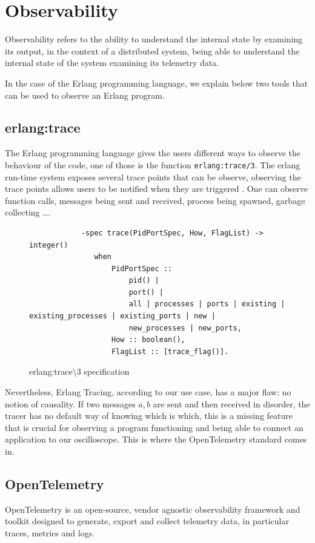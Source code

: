 \section{Observability}
        Observability refers to the ability to understand the internal state by examining its output, in the context of a distributed system, being able to understand the internal state of the system examining its telemetry data. \cite{otel-o}

    In the case of the Erlang programming language, we explain below two tools that can be used to observe an Erlang program.
    
    \subsection{erlang:trace}
        The Erlang programming language gives the users different ways to observe the behaviour of the code, one of those is the function \texttt{erlang:trace/3}. The erlang run-time system exposes several trace points that can be observe, observing the trace points allows users to be notified when they are triggered \cite{erl-t}. One can observe function calls, messages being sent and received, process being spawned, garbage collecting \dots. 
        \begin{figure}[!ht]
        \centering
        \begin{verbatim}
            -spec trace(PidPortSpec, How, FlagList) -> integer()
               when
                   PidPortSpec ::
                       pid() |
                       port() |
                       all | processes | ports | existing | existing_processes | existing_ports | new |
                       new_processes | new_ports,
                   How :: boolean(),
                   FlagList :: [trace_flag()].
        \end{verbatim}
        \caption{erlang:trace\textbackslash3 specification}
\end{figure}

    Nevertheless, Erlang Tracing, according to our use case, has a major flaw: no notion of causality. If two messages $a, b$ are sent and then received in disorder, the tracer has no default way of knowing which is which, this is a missing feature that is crucial for observing a program functioning and being able to connect an application to our oscilloscope.  This is where the OpenTelemetry standard comes in.

\subsection{OpenTelemetry}
    OpenTelemetry is an open-source, vendor agnostic observability framework and toolkit designed to generate, export and collect telemetry data, in particular traces, metrics and logs. \cite{otel-o} 

